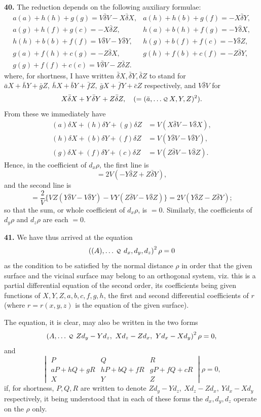 \documentclass[11pt,a4paper]{article}
\newcommand{\cayq}{\mathbin{\raisebox{0.08ex}{\(\scriptstyle\mathcal Q\)}}}
\newcommand{\qf}[2]{\left(#1\,\cayq\,#2\right)^2}
\newcommand{\Dx}{d_x}
\newcommand{\Dy}{d_y}
\newcommand{\Dz}{d_z}
\begin{document}
\newpage
\textbf{40.} The reduction depends on the following auxiliary formulae:
\begingroup\small
\[
\begin{array}{ll}
a(a)+h(h)+g(g)=V\bar\delta V-X\bar\delta X,&
a(h)+h(b)+g(f)=-X\bar\delta Y,\\
a(g)+h(f)+g(c)=-X\bar\delta Z,&
h(a)+b(h)+f(g)=-Y\bar\delta X,\\
h(h)+b(b)+f(f)=V\bar\delta V-Y\bar\delta Y,&
h(g)+b(f)+f(c)=-Y\bar\delta Z,\\
g(a)+f(h)+c(g)=-Z\bar\delta X,&
g(h)+f(b)+c(f)=-Z\bar\delta Y,\\
g(g)+f(f)+c(c)=V\bar\delta V-Z\bar\delta Z.&
\end{array}
\]
\endgroup
where, for shortness, I have written \(\bar\delta X,\bar\delta Y,\bar\delta Z\) to stand for
\(\bar aX+\bar hY+\bar gZ,\ \bar hX+\bar bY+\bar fZ,\ \bar gX+\bar fY+\bar cZ\)
respectively, and \(V\bar\delta V\) for
\[
X\bar\delta X+Y\bar\delta Y+Z\bar\delta Z,\quad(=(\bar a,\ldots\cayq X,Y,Z)^2).
\]
From these we immediately have
\begin{align*}
(a)\delta X+(h)\delta Y+(g)\delta Z&=V(X\bar\delta V-V\bar\delta X),\\
(h)\delta X+(b)\delta Y+(f)\delta Z&=V(Y\bar\delta V-V\bar\delta Y),\\
(g)\delta X+(f)\delta Y+(c)\delta Z&=V(Z\bar\delta V-V\bar\delta Z).
\end{align*}
Hence, in the coefficient of \(\Dx\rho\), the first line is
\[
=2V(-Y\bar\delta Z+Z\bar\delta Y),
\]
and the second line is
\[
=\frac2V\{VZ(Y\bar\delta V-V\bar\delta Y)-VY(Z\bar\delta V-V\bar\delta Z)\}
=2V(Y\bar\delta Z-Z\bar\delta Y);
\]
so that the sum, or whole coefficient of \(\Dx\rho\), is \(=0\). Similarly, the coefficients of
\(\Dy\rho\) and \(\Dz\rho\) are each \(=0\).

\textbf{41.} We have thus arrived at the equation
\[
\qf{(A),\ldots}{\Dx,\Dy,\Dz}\rho=0
\]
as the condition to be satisfied by the normal distance \(\rho\) in order that the given
surface and the vicinal surface may belong to an orthogonal system, viz. this is a
partial differential equation of the second order, its coefficients being given functions
of \(X,Y,Z,a,b,c,f,g,h\), the first and second differential coefficients of \(r\) (where
\(r=r(x,y,z)\) is the equation of the given surface).

The equation, it is clear, may also be written in the two forms
\[
\qf{A,\ldots}{Z\Dy-Y\Dz,\ X\Dz-Z\Dx,\ Y\Dx-X\Dy}\rho=0,
\]
and
\[
\begin{vmatrix}
P&Q&R\\
aP+hQ+gR&hP+bQ+fR&gP+fQ+cR\\
X&Y&Z
\end{vmatrix}\rho=0,
\]
if, for shortness, \(P,Q,R\) are written to denote \(Z\Dy-Y\Dz,\ X\Dz-Z\Dx,\ Y\Dx-X\Dy\)
respectively, it being understood that in each of these forms the \(\Dx,\Dy,\Dz\) operate on
the \(\rho\) only.
\end{document}
